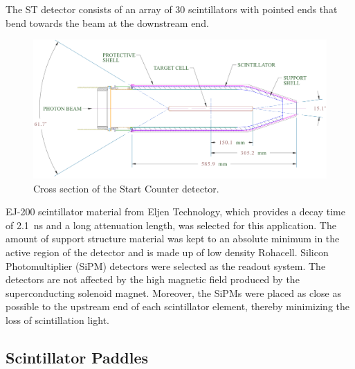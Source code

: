The ST detector consists of an array of 30 scintillators with pointed ends that bend towards the beam at the downstream end. 
	\begin{figure}[!htb]
		\centering
		\includegraphics[width=1.0\columnwidth]{design/figs/st_2d_labels}
		\caption{Cross section of the Start Counter detector.}
		\label{fig:st2dlabels}
	\end{figure}
EJ-200 scintillator material from Eljen Technology\cite{eljen}, which provides a decay time of 2.1~ns and a long attenuation length\cite{ej200_specs}, was selected for this application.  The amount of support structure material was kept to an absolute minimum in the active region of the detector and is made up of low density Rohacell\cite{rohacell}. Silicon Photomultiplier (SiPM) detectors were selected as the readout system. The detectors are not affected by the high magnetic field produced by the superconducting solenoid magnet. Moreover, the SiPMs were placed as close as possible to the upstream end of each scintillator element, thereby minimizing the loss of scintillation light\cite{pooser16}.

\subsection{Scintillator Paddles} \label{sec:design_paddles}


